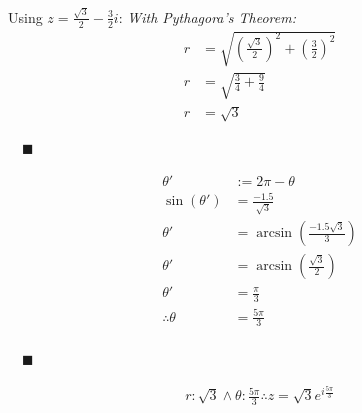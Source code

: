 \documentclass{myassignment}
\newcommand{\blackqed}{$\quad\blacksquare$}
\begin{document}
\begin{answer}
\begin{multicols}{2}
			Using $z = \frac{\sqrt{3}}{2} - \frac{3}{2}i$:
			\textit{\hspace*{2em}\small With Pythagora's Theorem:}
			\begin{align*}
				r &= \sqrt{(\frac{\sqrt{3}}{2})^2 +(\frac{3}{2})^2}\\
				r &= \sqrt{\frac{3}{4} + \frac{9}{4}} \\
				r &= \sqrt{3}
			\end{align*}
			\begin{flushright}\blackqed\end{flushright}
			\vspace*{-2em}
			\begin{align*}
				\theta' &:= 2\pi - \theta\\[1em]
				\sin(\theta') &= \frac{-1.5}{\sqrt{3}} \\
				\theta' &= \arcsin(\frac{-1.5\sqrt{3}}{3}) \\
				\theta' &= \arcsin(\frac{\sqrt{3}}{2}) \\
				\theta' &= \frac{\pi}{3} \\
				\therefore \theta  &= \frac{5\pi}{3} \\
			\end{align*}
			\begin{flushright}\blackqed\end{flushright}

		\end{multicols}
			\begin{align*}
				r: \sqrt{3} \land \theta: \frac{5\pi}{3} \therefore z = \sqrt{3}e^{i\frac{5\pi}{3}}
			\end{align*}
		\end{answer}
\end{document}
